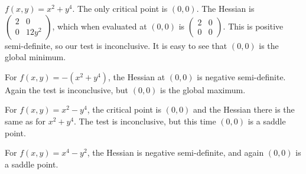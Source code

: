 \begin{examples}
    \item $f(x, y) = x^2 + y^4$.
    The only critical point is $(0, 0)$.
    The Hessian is $\begin{pmatrix}
        2 & 0 \\
        0 & 12y^2
    \end{pmatrix}$, which when evaluated at $(0, 0)$ is $\begin{pmatrix}
        2 & 0 \\
        0 & 0
    \end{pmatrix}$.
    This is positive semi-definite, so our test is inconclusive.
    It is easy to see that $(0, 0)$ is the global minimum.
    \item For $f(x, y) = -(x^2 + y^4)$, the Hessian at $(0, 0)$ is
    negative semi-definite.
    Again the test is inconclusive, but $(0, 0)$ is the global maximum.
    \item For $f(x, y) = x^2 - y^4$, the critical point is $(0, 0)$
    and the Hessian there is the same as for $x^2 + y^4$.
    The test is inconclusive, but this time $(0, 0)$ is a saddle point.
    \item For $f(x, y) = x^4 - y^2$, the Hessian is negative semi-definite,
    and again $(0, 0)$ is a saddle point.
\end{examples}

